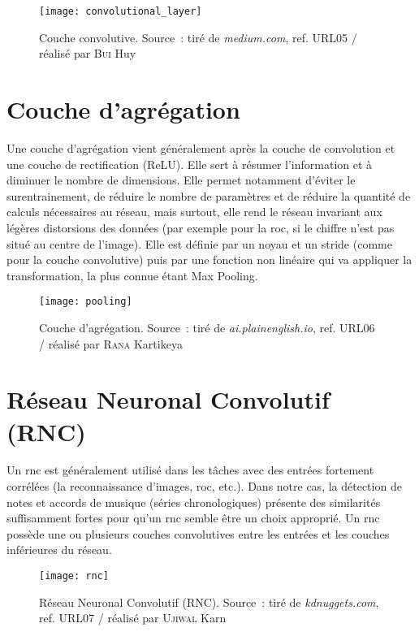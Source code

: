 \begin{figure}[H]
	\centering
	\texttt{[image: convolutional\_layer]}
	\caption[Couche convolutive]{Couche convolutive. Source : tiré de \textit{medium.com}, ref. URL05 / réalisé par \textsc{Bui} Huy}
	\label{fig:conv_layer}
\end{figure}

\section{Couche d'agrégation}
\label{sec:3.5}

Une couche d’agrégation vient généralement après la couche de convolution et une couche de rectification (ReLU). Elle sert à résumer l’information et à diminuer le nombre de dimensions. Elle permet notamment d’éviter le surentrainement, de réduire le nombre de paramètres et de réduire la quantité de calculs nécessaires au réseau, mais surtout, elle rend le réseau invariant aux légères distorsions des données (par exemple pour la \gls{roc}, si le chiffre n’est pas situé au centre de l’image). Elle est définie par un noyau et un stride (comme pour la couche convolutive) puis par une fonction non linéaire qui va appliquer la transformation, la plus connue étant Max Pooling.

\begin{figure}[H]
	\centering
	\texttt{[image: pooling]}
	\caption[Couche d'agrégation]{Couche d'agrégation. Source : tiré de \textit{ai.plainenglish.io}, ref. URL06 / réalisé par \textsc{Rana} Kartikeya}
	\label{fig:pooling}
\end{figure}

\section{Réseau Neuronal Convolutif (RNC)}
\label{sec:3.6}

Un \gls{rnc} est généralement utilisé dans les tâches avec des entrées fortement corrélées (la reconnaissance d'images, \gls{roc}, etc.). Dans notre cas, la détection de notes et accords de musique (séries chronologiques) présente des similarités suffisamment fortes pour qu'un \gls{rnc} semble être un choix approprié. Un \gls{rnc} possède une ou plusieurs couches convolutives entre les entrées et les couches inférieures du réseau.

\begin{figure}[H]
	\centering
	\texttt{[image: rnc]}
	\caption[Réseau Neuronal Convolutif (RNC)]{Réseau Neuronal Convolutif (RNC). Source : tiré de \textit{kdnuggets.com}, ref. URL07 / réalisé par \textsc{Ujiwal} Karn}
	\label{fig:rnc}
\end{figure}

